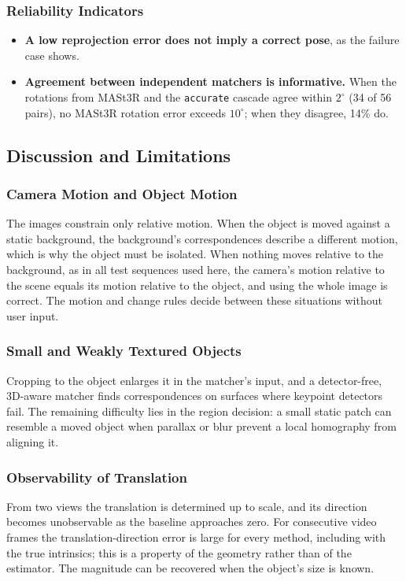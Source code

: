 \documentclass[journal]{IEEEtran}
\begin{document}
\subsubsection{Reliability Indicators}
\begin{itemize}
  \item \textbf{A low reprojection error does not imply a correct pose}, as the failure case shows.
  \item \textbf{Agreement between independent matchers is informative.} When the rotations from MASt3R and the \texttt{accurate} cascade agree within $2^\circ$ (34 of 56 pairs), no MASt3R rotation error exceeds $10^\circ$; when they disagree, 14\% do.
\end{itemize}

\subsection{Discussion and Limitations}

\subsubsection{Camera Motion and Object Motion}
The images constrain only relative motion. When the object is moved against a static background, the background's correspondences describe a different motion, which is why the object must be isolated. When nothing moves relative to the background, as in all test sequences used here, the camera's motion relative to the scene equals its motion relative to the object, and using the whole image is correct. The motion and change rules decide between these situations without user input.

\subsubsection{Small and Weakly Textured Objects}
Cropping to the object enlarges it in the matcher's input, and a detector-free, 3D-aware matcher finds correspondences on surfaces where keypoint detectors fail. The remaining difficulty lies in the region decision: a small static patch can resemble a moved object when parallax or blur prevent a local homography from aligning it.

\subsubsection{Observability of Translation}
From two views the translation is determined up to scale, and its direction becomes unobservable as the baseline approaches zero. For consecutive video frames the translation-direction error is large for every method, including with the true intrinsics; this is a property of the geometry rather than of the estimator. The magnitude can be recovered when the object's size is known.
\end{document}
